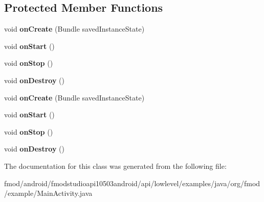 \subsection*{Protected Member Functions}
\begin{DoxyCompactItemize}
\item 
\hypertarget{classorg_1_1fmod_1_1example_1_1_main_activity_a607f211ac8d0f926708150acde395086}{void {\bfseries on\+Create} (Bundle saved\+Instance\+State)}\label{classorg_1_1fmod_1_1example_1_1_main_activity_a607f211ac8d0f926708150acde395086}

\item 
\hypertarget{classorg_1_1fmod_1_1example_1_1_main_activity_a6ea35f19760ec533ce0c427fb38a4073}{void {\bfseries on\+Start} ()}\label{classorg_1_1fmod_1_1example_1_1_main_activity_a6ea35f19760ec533ce0c427fb38a4073}

\item 
\hypertarget{classorg_1_1fmod_1_1example_1_1_main_activity_ae47dd840622948ab04b51962053b9f40}{void {\bfseries on\+Stop} ()}\label{classorg_1_1fmod_1_1example_1_1_main_activity_ae47dd840622948ab04b51962053b9f40}

\item 
\hypertarget{classorg_1_1fmod_1_1example_1_1_main_activity_a8ab86c805aab82c1fd7d4ba41769a2c5}{void {\bfseries on\+Destroy} ()}\label{classorg_1_1fmod_1_1example_1_1_main_activity_a8ab86c805aab82c1fd7d4ba41769a2c5}

\item 
\hypertarget{classorg_1_1fmod_1_1example_1_1_main_activity_a607f211ac8d0f926708150acde395086}{void {\bfseries on\+Create} (Bundle saved\+Instance\+State)}\label{classorg_1_1fmod_1_1example_1_1_main_activity_a607f211ac8d0f926708150acde395086}

\item 
\hypertarget{classorg_1_1fmod_1_1example_1_1_main_activity_a6ea35f19760ec533ce0c427fb38a4073}{void {\bfseries on\+Start} ()}\label{classorg_1_1fmod_1_1example_1_1_main_activity_a6ea35f19760ec533ce0c427fb38a4073}

\item 
\hypertarget{classorg_1_1fmod_1_1example_1_1_main_activity_ae47dd840622948ab04b51962053b9f40}{void {\bfseries on\+Stop} ()}\label{classorg_1_1fmod_1_1example_1_1_main_activity_ae47dd840622948ab04b51962053b9f40}

\item 
\hypertarget{classorg_1_1fmod_1_1example_1_1_main_activity_a8ab86c805aab82c1fd7d4ba41769a2c5}{void {\bfseries on\+Destroy} ()}\label{classorg_1_1fmod_1_1example_1_1_main_activity_a8ab86c805aab82c1fd7d4ba41769a2c5}

\end{DoxyCompactItemize}


The documentation for this class was generated from the following file\+:\begin{DoxyCompactItemize}
\item 
fmod/android/fmodstudioapi10503android/api/lowlevel/examples/java/org/fmod/example/Main\+Activity.\+java\end{DoxyCompactItemize}
